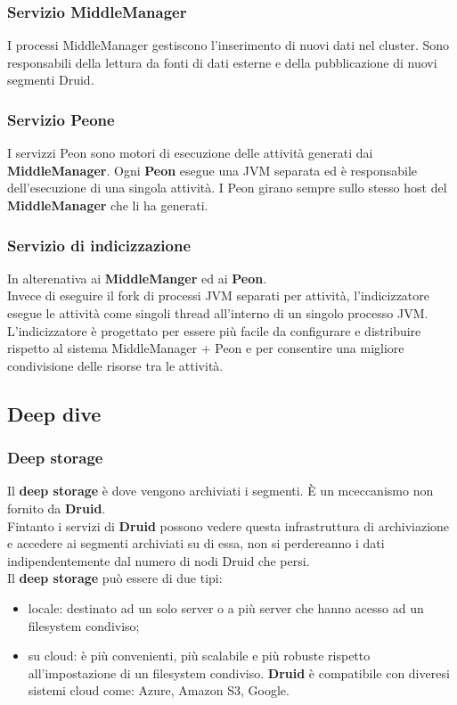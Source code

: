 \documentclass{article}
\begin{document}
\subsubsection{Servizio MiddleManager}
I processi MiddleManager gestiscono l'inserimento di nuovi dati nel cluster. Sono responsabili della lettura da fonti di dati esterne e della pubblicazione di nuovi segmenti Druid.
\subsubsection{Servizio Peone}
I servizzi Peon sono motori di esecuzione delle attività generati dai \textbf{MiddleManager}. Ogni \textbf{Peon} esegue una JVM separata ed è responsabile dell'esecuzione di una singola attività. I Peon girano sempre sullo stesso host del \textbf{MiddleManager} che li ha generati.
\subsubsection{Servizio di indicizzazione}
In alterenativa ai \textbf{MiddleManger} ed ai \textbf{Peon}.\\
Invece di eseguire il fork di processi JVM separati per attività, l'indicizzatore esegue le attività come singoli thread all'interno di un singolo processo JVM.\\
L'indicizzatore è progettato per essere più facile da configurare e distribuire rispetto al sistema MiddleManager + Peon e per consentire una migliore condivisione delle risorse tra le attività. 
\subsection{Deep dive}
\subsubsection{Deep storage}
Il \textbf{deep storage} è dove vengono archiviati i segmenti. È un mceccanismo non fornito da \textbf{Druid}.\\
Fintanto i servizi di \textbf{Druid} possono vedere questa infrastruttura di archiviazione e accedere ai segmenti archiviati su di essa, non  si perdereanno i  dati indipendentemente dal numero di nodi Druid che persi.\\
Il \textbf{deep storage} può essere di due tipi:
\begin{itemize}
    \item locale: destinato ad un solo server o a più server che hanno  acesso ad un filesystem condiviso;
    \item su cloud: è più convenienti, più scalabile e più robuste rispetto all'impostazione di un filesystem condiviso. \textbf{Druid} è compatibile con diveresi sistemi cloud come: Azure, Amazon S3, Google.
\end{itemize}
\end{document}
